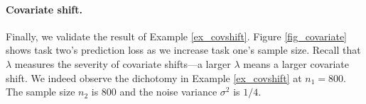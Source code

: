 \paragraph{Covariate shift.}
Finally, we validate the result of Example \ref{ex_covshift}.
Figure \ref{fig_covariate} shows task two's prediction loss as we increase task one's sample size.
Recall that $\lambda$ measures the severity of covariate shifts---a larger $\lambda$ means a larger covariate shift.
We indeed observe the dichotomy in Example \ref{ex_covshift} at $n_1 = 800$.
The sample size $n_2$ is $800$ and the noise variance $\sigma^2$ is $1/4$.



